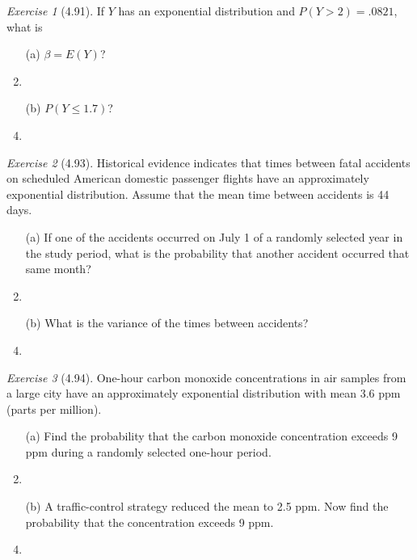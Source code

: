 \documentclass[12pt]{amsart}
\makeatletter
\theoremstyle{remark}
\newtheorem*{exercise}{Exercise}%
\renewenvironment{proof}[1][\proofname]{\par\doublespacing
  \pushQED{\qed}%
  \normalfont \topsep6\p@\@plus6\p@\relax
  \list{}{%
    \settowidth{\leftmargin}{\itshape\proofname:\hskip\labelsep}%
    \setlength{\labelwidth}{0pt}%
    \setlength{\itemindent}{-\leftmargin}%
  }%
  \item[\hskip\labelsep\itshape#1\@addpunct{:}]\ignorespaces
}{%
  \popQED\endlist\@endpefalse
  \singlespacing
}
\theoremstyle{mycomment}
\makeatother
\begin{document}
\begin{exercise}[4.91]
If $Y$ has an exponential distribution and $P(Y > 2) = .0821$, what is

\begin{enumerate}
    \item[(a)] $\beta = E(Y)$?
\begin{proof}[Solution]
 
\end{proof}
    \item[(b)] $P(Y \leq 1.7)$?
\begin{proof}[Solution]
 
\end{proof}
\end{enumerate}
\end{exercise}

\begin{exercise}[4.93]
Historical evidence indicates that times between fatal accidents on scheduled American domestic passenger flights have an approximately exponential distribution. Assume that the mean time between accidents is 44 days.

\begin{enumerate}
    \item[(a)] If one of the accidents occurred on July 1 of a randomly selected year in the study period, what is the probability that another accident occurred that same month?
\begin{proof}[Solution]
 
\end{proof}
    \item[(b)] What is the variance of the times between accidents?
\begin{proof}[Solution]
 
\end{proof}
\end{enumerate}
\end{exercise}

\begin{exercise}[4.94]
One-hour carbon monoxide concentrations in air samples from a large city have an approximately exponential distribution with mean 3.6 ppm (parts per million).

\begin{enumerate}
    \item[(a)] Find the probability that the carbon monoxide concentration exceeds 9 ppm during a randomly selected one-hour period.
\begin{proof}[Solution]
 
\end{proof}
    \item[(b)] A traffic-control strategy reduced the mean to 2.5 ppm. Now find the probability that the concentration exceeds 9 ppm.
\begin{proof}[Solution]
 
\end{proof}
\end{enumerate}
\end{exercise}
\end{document}
